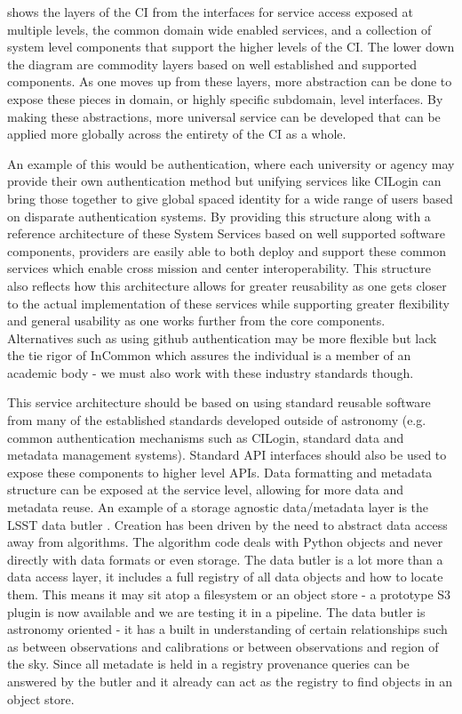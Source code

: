  shows the
layers of the \gls{CI} from the interfaces for service access exposed
at multiple levels, the common domain wide enabled services, and a collection of system level components that support the
higher levels of the \gls{CI}.
The lower down the diagram are commodity layers based on well established and supported
components. As one moves up from these layers, more abstraction can be done to
expose these pieces in domain, or highly specific subdomain, level interfaces. By making these
abstractions, more universal service can be developed that can be applied more globally
across the entirety of the \gls{CI} as a whole.

An example of this would be
authentication, where each university or agency may provide their own authentication method
but unifying services like CILogin can bring those together to give global spaced
identity for a wide range of users based on disparate authentication systems.
By providing this structure along with a reference architecture of these System Services based on
well supported software components, providers are easily able to both deploy and support these common services which enable
cross mission and center interoperability. This structure also reflects how this architecture allows for greater reusability as one gets closer to the actual implementation of these
services while supporting greater flexibility and general usability as one works further from the core components.
Alternatives such as using github authentication may be more flexible but lack the tie rigor of InCommon which assures the individual is a member of an academic body - we must also work with these industry standards though.

This service architecture should be based on using standard reusable software from many of the established standards developed outside of astronomy (e.g. common authentication mechanisms such as CILogin, standard data and \gls{metadata} management systems).  Standard \gls{API} interfaces should also be used to expose these components to higher level \gls{API}s. Data
formatting and \gls{metadata} structure can be exposed at the service level, allowing for
more data and \gls{metadata} reuse.
 An example of a storage agnostic data/metadata layer is the \gls{LSST} data butler \citep{2018arXiv181208085J}. Creation  has been driven by the need to abstract data access away from algorithms.
The \gls{algorithm} code deals with Python objects and never directly with data formats or even storage. The data butler is a lot more than a data access layer, it includes a full registry of all data objects and how to locate them. This means it may sit atop a filesystem or an object store - a prototype S3 plugin is now available and we are testing it in a \gls{pipeline}.  The data butler is astronomy oriented - it has a built in understanding of certain relationships such as between observations and calibrations or between observations and region of the sky. Since all metadate is held in a registry \gls{provenance} queries can be answered by the butler and it already can act as the registry to find objects in an object store.



